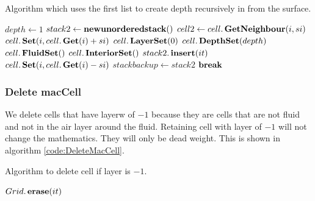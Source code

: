 		\begin{algorithm}
\caption{Algorithm which uses the first list to create depth recursively in from the surface.}
\label{code:CreateInteriorDepth3}
\begin{algorithmic}[1]
		\State $depth\gets 1$
		\Loop
			\State $stack2 \gets \mathop{\textbf{newunorderedstack}}()$ 
						\State $cell2 \gets cell.\mathop{\textbf{GetNeighbour}}(i,si)$
							\State $cell.\mathop{\textbf{Set}}(i,cell.\mathop{\textbf{Get}}(i)+si)$
							\State $cell.\mathop{\textbf{LayerSet}}(0)$
							\State $cell.\mathop{\textbf{DepthSet}}(depth)$
								\State $cell.\mathop{\textbf{FluidSet}}()$
							\Else
								\State $cell.\mathop{\textbf{InteriorSet}}()$ 
							\EndIf
							\State $stack2.\mathop{\textbf{insert}}(it)$ 
							\State $cell.\mathop{\textbf{Set}}(i,cell.\mathop{\textbf{Get}}(i)-si)$
						\EndIf
					\EndFor
				\EndFor
			\EndFor
			\State $stackbackup\gets stack2$ 
			 
				\State $\mathop{\textbf{break}}$
			\EndIf
		\EndLoop
	\EndProcedure
\end{algorithmic}
\end{algorithm}

\subsubsection{Delete macCell}

We delete cells that have layerw of $-1$ because they are cells that are not fluid and not in the air layer around the fluid.
Retaining cell with layer of $-1$ will not change the mathematics. They will only be dead weight.
This is shown in algorithm \ref{code:DeleteMacCell}.
\begin{algorithm}
\caption{Algorithm to delete cell if layer is $-1$.}
\label{code:DeleteMacCell}
\begin{algorithmic}[1]
			\State $Grid.\mathop{\textbf{erase}}(it)$
		\EndIf
	\EndFor
\EndProcedure
\end{algorithmic}
\end{algorithm}

